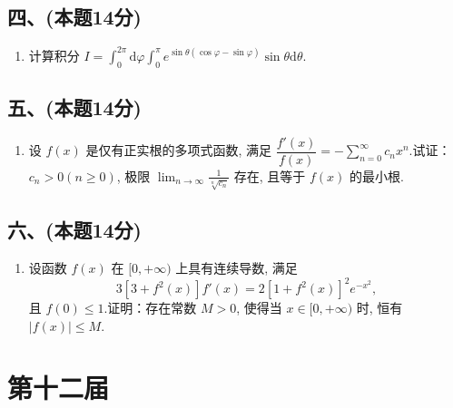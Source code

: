 \subsection*{四、(本题14分)}
\begin{enumerate}[start=8]
    \item 计算积分 $I = \displaystyle\int_0^{2\pi} \mathrm{d}\varphi \int_0^\pi e^{\sin \theta (\cos \varphi - \sin \varphi)} \sin \theta  \mathrm{d}\theta$.
\end{enumerate}

\subsection*{五、(本题14分)}
\begin{enumerate}[start=9]
    \item 设 $f(x)$ 是仅有正实根的多项式函数, 满足 $\dfrac{f'(x)}{f(x)} = - \displaystyle\sum_{n=0}^{\infty} c_n x^n$.试证：$c_n > 0  (n \geqslant 0)$, 极限 $\displaystyle\lim_{n \to \infty} \frac{1}{\sqrt[n]{c_n}}$ 存在, 且等于 $f(x)$ 的最小根.
\end{enumerate}

\subsection*{六、(本题14分)}
\begin{enumerate}[start=10]
    \item 设函数 $f(x)$ 在 $[0,  +\infty)$ 上具有连续导数, 满足
          \[
              3[3 + f^2(x)] f'(x) = 2[1 + f^2(x)]^2 e^{-x^2},
          \]
          且 $f(0) \leqslant 1$.证明：存在常数 $M > 0$, 使得当 $x \in [0,  +\infty)$ 时, 恒有 $|f(x)| \leqslant M$.
\end{enumerate}


\newpage
\section{第十二届}

